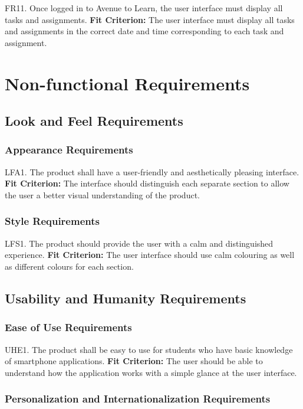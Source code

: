 \documentclass[12pt, titlepage]{article}
\begin{document}
\noindent FR11. Once logged in to Avenue to Learn, the user interface must display all tasks and assignments.
	\textbf{Fit Criterion:} The user interface must display all tasks and assignments in the correct 
date and time corresponding to each task and assignment.

\section{Non-functional Requirements}

\subsection{Look and Feel Requirements}

\subsubsection{Appearance Requirements}

LFA1. The product shall have a user-friendly and aesthetically pleasing interface.
	\textbf{Fit Criterion:} The interface should distinguish each separate section to allow the user a 
better visual understanding of the product.

\subsubsection{Style Requirements}

LFS1. The product should provide the user with a calm and distinguished experience.
	\textbf{Fit Criterion:} The user interface should use calm colouring as well as different colours 
for each section.

\subsection{Usability and Humanity Requirements}

\subsubsection{Ease of Use Requirements}

UHE1. The product shall be easy to use for students who have basic knowledge of smartphone applications.
	\textbf{Fit Criterion:} The user should be able to understand how the application works with a 
simple glance at the user interface.

\subsubsection{Personalization and Internationalization Requirements}
\end{document}
